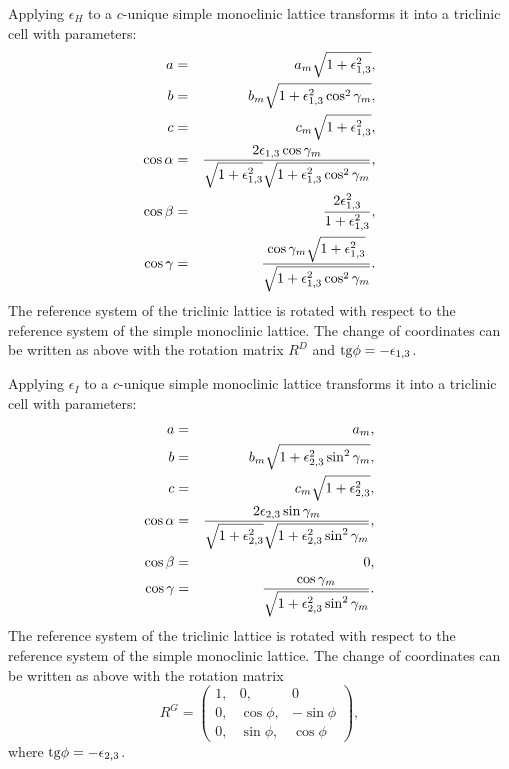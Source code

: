 \documentclass[12pt,a4paper]{article}
\begin{document}
Applying $\epsilon_H$ to a $c$-unique simple monoclinic lattice transforms
it into a triclinic cell with parameters:
\begin{eqnarray}
a&=&a_m \sqrt{1+\epsilon_{1,3}^2}, \\
b&=&b_m \sqrt{1+\epsilon_{1,3}^2 \cos^2\gamma_m}, \\
c&=&c_m \sqrt{1+\epsilon_{1,3}^2}, \\
\cos\alpha &=& {2 \epsilon_{1,3} \cos\gamma_m \over 
\sqrt{1+\epsilon_{1,3}^2} \sqrt{1+\epsilon_{1,3}^2 \cos^2\gamma_m}}, \\
\cos\beta &=& {2 \epsilon_{1,3}^2 \over 1+\epsilon_{1,3}^2}, \\
\cos\gamma &=& {\cos\gamma_m \sqrt{1+\epsilon_{1,3}^2} \over
\sqrt{1+\epsilon_{1,3}^2 \cos^2\gamma_m}}.
\end{eqnarray}
The reference system of the triclinic lattice is rotated 
with respect to the reference system of the simple 
monoclinic lattice. 
The change of coordinates can be written as above with the rotation matrix 
$R^D$ and ${\rm tg}\phi=-\epsilon_{1,3}$.

Applying $\epsilon_I$ to a $c$-unique simple monoclinic lattice transforms
it into a triclinic cell with parameters:
\begin{eqnarray}
a&=&a_m,  \\
b&=&b_m \sqrt{1+\epsilon_{2,3}^2 \sin^2\gamma_m}, \\
c&=&c_m \sqrt{1+\epsilon_{2,3}^2}, \\
\cos\alpha &=& {2 \epsilon_{2,3} \sin\gamma_m \over 
\sqrt{1+\epsilon_{2,3}^2} \sqrt{1+\epsilon_{2,3}^2 \sin^2\gamma_m}}, \\
\cos\beta &=& 0, \\
\cos\gamma &=& { \cos\gamma_m  \over
\sqrt{1+\epsilon_{2,3}^2 \sin^2\gamma_m}}.
\end{eqnarray}
The reference system of the triclinic lattice is rotated 
with respect to the reference system of the simple 
monoclinic lattice. 
The change of coordinates can be written as above with the rotation matrix 
\begin{equation}
R^G=\left( \begin{array}{ccc}
1, & 0, & 0 \\
0, & \cos \phi, &  -\sin \phi
\\
0, & \sin \phi, & \cos \phi 
\end{array}
\right),
\end{equation}
where  ${\rm tg}\phi=-\epsilon_{2,3}$.
\end{document}
